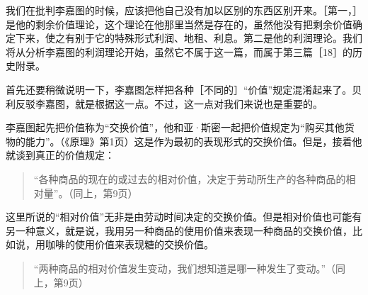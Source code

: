 我们在批判李嘉图的时候，应该把他自己没有加以区别的东西区别开来。［第一，］是他的剩余价值理论，这个理论在他那里当然是存在的，虽然他没有把剩余价值确定下来，使之有别于它的特殊形式利润、地租、利息。第二是他的利润理论。我们将从分析李嘉图的利润理论开始，虽然它不属于这一篇，而属于第三篇［18］的历史附录。


首先还要稍微说明一下，李嘉图怎样把各种［不同的］“价值”规定混淆起来了。贝利反驳李嘉图，就是根据这一点。不过，这一点对我们来说也是重要的。

李嘉图起先把价值称为“交换价值”，他和亚·斯密一起把价值规定为“购买其他货物的能力”。（《原理》第1页）这是作为最初的表现形式的交换价值。但是，接着他就谈到真正的价值规定：

\begin{quote}{“各种商品的现在的或过去的相对价值，决定于劳动所生产的各种商品的相对量”。（同上，第9页）}\end{quote}

这里所说的“相对价值”无非是由劳动时间决定的交换价值。但是相对价值也可能有另一种意义，就是说，我用另一种商品的使用价值来表现一种商品的交换价值，比如说，用咖啡的使用价值来表现糖的交换价值。

\begin{quote}{“两种商品的相对价值发生变动，我们想知道是哪一种发生了变动。”（同上，第9页）}\end{quote}


